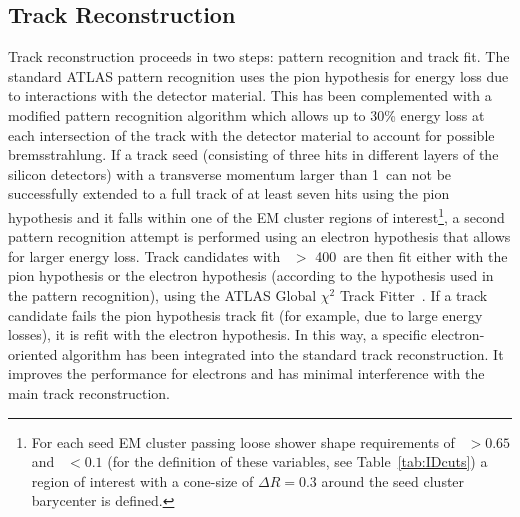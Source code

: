 
\subsection{Track Reconstruction}
Track reconstruction proceeds in two steps: pattern recognition and track fit.
The standard ATLAS pattern recognition uses the pion hypothesis for energy loss due to interactions with the detector material. 
This has been complemented with a modified pattern recognition algorithm which allows up to 30\% energy loss at each intersection of the track with the detector material to account for possible bremsstrahlung.
If a track seed (consisting of three hits in different layers of the silicon detectors) with a transverse momentum larger than 1~\GeV can not be successfully extended to a full track of at least seven hits using the pion hypothesis and it falls within one of the EM cluster regions of interest\footnote{For each seed EM cluster passing loose shower shape requirements of \reta\ $> 0.65$ and \rhad\ $< 0.1$ (for the definition of these variables, see Table~\ref{tab:IDcuts}) a region of interest with a cone-size of $\Delta R = 0.3$ around the seed cluster barycenter is defined.}, a second pattern recognition attempt is performed using an electron hypothesis that allows for larger energy loss.
Track candidates with \pt\ $>$ 400~\MeV are then fit either with the pion hypothesis or the electron hypothesis (according to the hypothesis used in the pattern recognition), using the ATLAS Global $\chi^2$ Track Fitter~\cite{ATLASTrackFitter}. 
If a track candidate fails the pion hypothesis track fit (for example, due to large energy losses), it is refit with the electron hypothesis. In this way, a specific electron-oriented algorithm has been integrated into the standard track reconstruction.
It improves the performance for electrons and has minimal interference with the
main track reconstruction.

